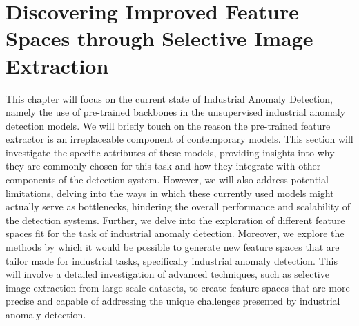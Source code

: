 \chapter{Discovering Improved Feature Spaces through Selective Image Extraction}
\label{chapter:ch3}

This chapter will focus on the current state of Industrial Anomaly Detection, namely the use of pre-trained backbones in the unsupervised industrial anomaly detection models\cite{iad_survey}\cite{pre_trained_iad}. We will briefly touch on the reason the pre-trained feature extractor is an irreplaceable component of contemporary models\cite{pre_trained_iad}\cite{bergman2020deepnearestneighboranomaly}. This section will investigate the specific attributes of these models, providing insights into why they are commonly chosen for this task and how they integrate with other components of the detection system. However, we will also address potential limitations, delving into the ways in which these currently used models might actually serve as bottlenecks, hindering the overall performance and scalability of the detection systems. Further, we delve into the exploration of different feature spaces fit for the task of industrial anomaly detection. Moreover, we explore the methods by which it would be possible to generate new feature spaces that are tailor made for industrial tasks, specifically industrial anomaly detection. This will involve a detailed investigation of advanced techniques, such as selective image extraction from large-scale datasets, to create feature spaces that are more precise and capable of addressing the unique challenges presented by industrial anomaly detection.


